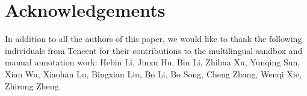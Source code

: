 
\section{Acknowledgements}

In addition to all the authors of this paper, we would like to thank the following individuals from Tencent for their contributions to the multilingual sandbox and manual annotation work: Hebin Li, Jinxu Hu, Bin Li, Zhihua Xu, Yunqing Sun, Xian Wu, Xiaohan Lu, Bingxian Liu, Bo Li, Bo Song, Cheng Zhang, Wenqi Xie, Zhirong Zheng.






